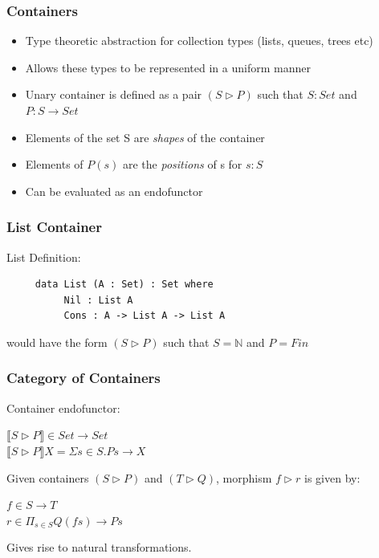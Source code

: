 \documentclass{beamer}
\begin{document}

\begin{frame}
\frametitle{Containers}
\begin{itemize}
\item Type theoretic abstraction for collection types (lists, queues, trees etc)
\item Allows these types to be represented in  a uniform manner
\item Unary container is defined as a pair $ (S \rhd P)$ such that $ S : Set $ and $ P : S \to Set $
\item Elements of the set S are \textit{shapes} of the container
\item Elements of $P(s)$ are the \textit{positions} of s for $ s : S $
\item Can be evaluated as an endofunctor
\end{itemize}
\end{frame}


\begin{frame}[fragile]
\frametitle{List Container}
List Definition:
\begin{verbatim}
     data List (A : Set) : Set where
          Nil : List A
          Cons : A -> List A -> List A
\end{verbatim}
would have the form $ (S \rhd P)$ such that $ S = \mathbb{N} $ and $ P = Fin $
\end{frame}


\begin{frame}
\frametitle{Category of Containers}

Container endofunctor:\\
\begin{center}
$\llbracket S \rhd P\rrbracket \in Set \to Set$\\
$ \llbracket S \rhd P\rrbracket X = \Sigma s \in S. P s \to X $\\
\end{center}
\smallskip
Given containers $ (S \rhd P)$ and $ (T \rhd Q)$, morphism $ f \rhd r $ is given by:\\
\medskip
\begin{center}
$f \in S \to T$\\
$r \in \Pi _{s \in S} Q(f s) \to P s $\\
\end{center}
Gives rise to natural transformations.


\end{frame}
\end{document}
